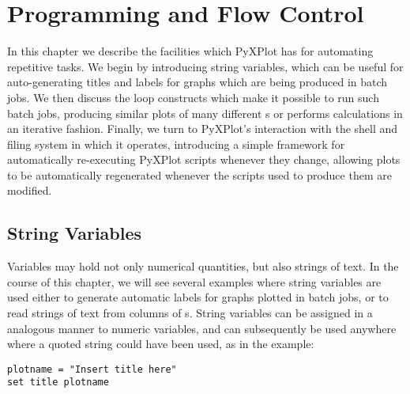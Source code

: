 %
%
%
%
%



\chapter{Programming and Flow Control}

In this chapter we describe the facilities which PyXPlot has for automating
repetitive tasks. We begin by introducing string variables, which can be useful
for auto-generating titles and labels for graphs which are being produced in
batch jobs. We then discuss the loop constructs which make it possible to run
such batch jobs, producing similar plots of many different \datafile s or
performs calculations in an iterative fashion. Finally, we turn to PyXPlot's
interaction with the shell and filing system in which it operates, introducing
a simple framework for automatically re-executing PyXPlot scripts whenever they
change, allowing plots to be automatically regenerated whenever the scripts
used to produce them are modified.

\section{String Variables}
\label{sec:stringvars}

Variables may hold not only numerical quantities, but also strings of text.  In
the course of this chapter, we will see several examples where string variables
are used either to generate automatic labels for graphs plotted in batch jobs,
or to read strings of text from columns of \datafile s. String variables can be
assigned in a analogous manner to numeric variables, and can subsequently be
used anywhere where a quoted string could have been used, as in the example:
\begin{verbatim}
plotname = "Insert title here"
set title plotname
\end{verbatim}

